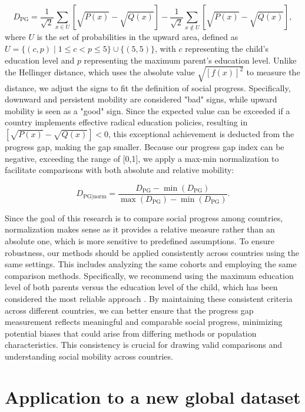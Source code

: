 \[
D_{\text{PG}} = \frac{1}{\sqrt{2}} \sum_{x \in U} \left[ \sqrt{P(x)} - \sqrt{Q(x)} \right] - \frac{1}{\sqrt{2}} \sum_{x \notin U} \left[ \sqrt{P(x)} - \sqrt{Q(x)} \right],
\]
where \( U \) is the set of probabilities in the upward area, defined as \( U = \{ (c,p) \mid 1 \leq c < p \leq 5 \} \cup \{ (5,5) \} \), with \( c \) representing the child's education level and \( p \) representing the maximum parent's education level. Unlike the Hellinger distance, which uses the absolute value \( \sqrt{[f(x)]^2} \) to measure the distance, we adjust the signs to fit the definition of social progress. Specifically, downward and persistent mobility are considered "bad" signs, while upward mobility is seen as a "good" sign. Since the expected value can be exceeded if a country implements effective radical education policies, resulting in \( \left[\sqrt{P(x)} - \sqrt{Q(x)}\right] < 0 \), this exceptional achievement is deducted from the progress gap, making the gap smaller. Because our progress gap index can be negative, exceeding the range of [0,1], we apply a max-min normalization to facilitate comparisons with both absolute and relative mobility:

\[
D_{\text{PG}|\text{norm}} = \frac{D_{\text{PG}} - \min(D_{\text{PG}})}{\max(D_{\text{PG}}) - \min(D_{\text{PG}})}.
\]

Since the goal of this research is to compare social progress among countries, normalization makes sense as it provides a relative measure rather than an absolute one, which is more sensitive to predefined assumptions. To ensure robustness, our methods should be applied consistently across countries using the same settings. This includes analyzing the same cohorts and employing the same comparison methods. Specifically, we recommend using the maximum education level of both parents versus the education level of the child, which has been considered the most reliable approach \citep{van2024intergenerational}. By maintaining these consistent criteria across different countries, we can better ensure that the progress gap measurement reflects meaningful and comparable social progress, minimizing potential biases that could arise from differing methods or population characteristics. This consistency is crucial for drawing valid comparisons and understanding social mobility across countries.

\section{Application to a new global dataset} \label{sec:application}


